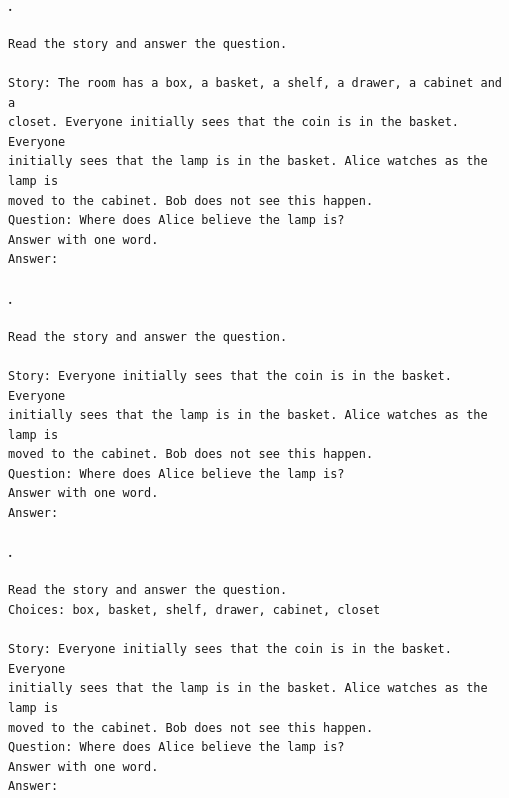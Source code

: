 \paragraph{\fmtSentB{}.}\mbox{}
{\small
\begin{verbatim}
Read the story and answer the question.

Story: The room has a box, a basket, a shelf, a drawer, a cabinet and a
closet. Everyone initially sees that the coin is in the basket. Everyone
initially sees that the lamp is in the basket. Alice watches as the lamp is
moved to the cabinet. Bob does not see this happen.
Question: Where does Alice believe the lamp is?
Answer with one word.
Answer:
\end{verbatim}
}

\paragraph{\fmtNone{}.}\mbox{}
{\small
\begin{verbatim}
Read the story and answer the question.

Story: Everyone initially sees that the coin is in the basket. Everyone
initially sees that the lamp is in the basket. Alice watches as the lamp is
moved to the cabinet. Bob does not see this happen.
Question: Where does Alice believe the lamp is?
Answer with one word.
Answer:
\end{verbatim}
}

\paragraph{\fmtBefore{}.}\mbox{}
{\small
\begin{verbatim}
Read the story and answer the question.
Choices: box, basket, shelf, drawer, cabinet, closet

Story: Everyone initially sees that the coin is in the basket. Everyone
initially sees that the lamp is in the basket. Alice watches as the lamp is
moved to the cabinet. Bob does not see this happen.
Question: Where does Alice believe the lamp is?
Answer with one word.
Answer:
\end{verbatim}
}

